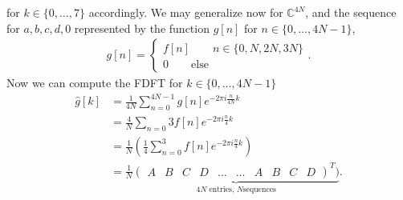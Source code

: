 \documentclass[a4paper]{article}
\begin{document}
for $k \in \{0,\dots, 7\}$ accordingly. We may generalize now for
$\mathbb{C}^{4N}$, and the sequence for $a, b, c, d, 0$ represented by the
function $g[n]$ for $n \in \{0,\dots, 4N-1\}$,
\begin{align}
    g[n] =\begin{cases}
        f[n] \qquad n\in \{0, N, 2N, 3N\}\\
        0 \qquad \text{else}
        \end{cases}.
\end{align}
Now we can compute the FDFT for $k \in \{0,\dots, 4N-1\}$
\begin{align}
    \hat{g}[k] &= \frac{1}{4N}\sum_{n=0}^{4N-1} g[n]e^{-2\pi i
    \frac{n}{4N}k}\\
         &=\frac{4}{N}\sum_{n=0}{3}f[n]e^{-2\pi i \frac{n}{4}k}\\
         &=\frac{1}{N}\left(\frac{1}{4}\sum_{n=0}^3 f[n] e^{-2\pi i
         \frac{n}{4}k} \right) \\
         &= \frac{1}{N} \underbrace{\begin{pmatrix}A & B & C & D & \dots &
             \dots & A & B & C & D\end{pmatrix}^T)}_{\text{$4N$ entries, $N$
         sequences}}.
\end{align}
\end{document}
